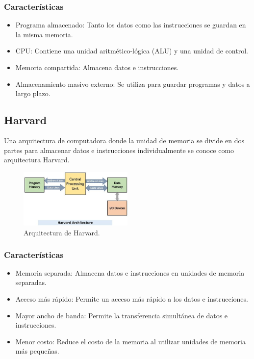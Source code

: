 \documentclass[12pt]{report}
\begin{document}
\subsubsection{Características}
\begin{itemize}
  \item Programa almacenado: Tanto los datos como las instrucciones se guardan en la misma memoria.
  \item CPU: Contiene una unidad aritmético-lógica (ALU) y una unidad de control.
  \item Memoria compartida: Almacena datos e instrucciones.
  \item Almacenamiento masivo externo: Se utiliza para guardar programas y datos a largo plazo.
\end{itemize}
\subsection{Harvard}
Una arquitectura de computadora donde la unidad de memoria se divide en dos partes para almacenar datos e instrucciones individualmente se conoce como arquitectura Harvard. \cite{4}
\begin{figure}[H]
  \centering
  \includegraphics[width=0.5\textwidth]{Harvard.png}
  \caption{Arquitectura de Harvard.}
  \label{fig:harvard}
\end{figure}
\subsubsection{Características}
\begin{itemize}
  \item Memoria separada: Almacena datos e instrucciones en unidades de memoria separadas.
  \item Acceso más rápido: Permite un acceso más rápido a los datos e instrucciones.
  \item Mayor ancho de banda: Permite la transferencia simultánea de datos e instrucciones.
  \item Menor costo: Reduce el costo de la memoria al utilizar unidades de memoria más pequeñas.
\end{itemize}
\end{document}
